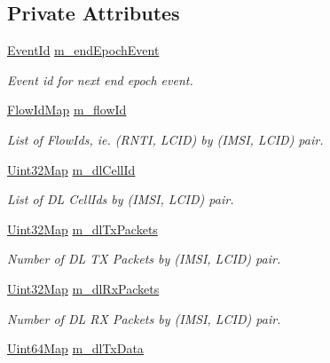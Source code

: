 \subsection*{Private Attributes}
\begin{DoxyCompactItemize}
\item 
\hyperlink{classns3_1_1EventId}{Event\+Id} \hyperlink{classns3_1_1RadioBearerStatsCalculator_a5e84f4991b455536d143b8c83a820689}{m\+\_\+end\+Epoch\+Event}
\begin{DoxyCompactList}\small\item\em Event id for next end epoch event. \end{DoxyCompactList}\item 
\hyperlink{namespacens3_aab54007b3e014c13ffebdb845302cd83}{Flow\+Id\+Map} \hyperlink{classns3_1_1RadioBearerStatsCalculator_aab26a340278a0dcfb541f2d98917c9a0}{m\+\_\+flow\+Id}
\begin{DoxyCompactList}\small\item\em List of Flow\+Ids, ie. (R\+N\+TI, L\+C\+ID) by (I\+M\+SI, L\+C\+ID) pair. \end{DoxyCompactList}\item 
\hyperlink{namespacens3_abfd8d9eba8902c110c885a991a0529cd}{Uint32\+Map} \hyperlink{classns3_1_1RadioBearerStatsCalculator_adf1e6e6d99c7fce763acea10d9fcbe7f}{m\+\_\+dl\+Cell\+Id}
\begin{DoxyCompactList}\small\item\em List of DL Cell\+Ids by (I\+M\+SI, L\+C\+ID) pair. \end{DoxyCompactList}\item 
\hyperlink{namespacens3_abfd8d9eba8902c110c885a991a0529cd}{Uint32\+Map} \hyperlink{classns3_1_1RadioBearerStatsCalculator_aea685741eb32f0f501496176deb32ccb}{m\+\_\+dl\+Tx\+Packets}
\begin{DoxyCompactList}\small\item\em Number of DL TX Packets by (I\+M\+SI, L\+C\+ID) pair. \end{DoxyCompactList}\item 
\hyperlink{namespacens3_abfd8d9eba8902c110c885a991a0529cd}{Uint32\+Map} \hyperlink{classns3_1_1RadioBearerStatsCalculator_a860af56e1228ba010a126eea7d5d0da1}{m\+\_\+dl\+Rx\+Packets}
\begin{DoxyCompactList}\small\item\em Number of DL RX Packets by (I\+M\+SI, L\+C\+ID) pair. \end{DoxyCompactList}\item 
\hyperlink{namespacens3_a02246d7bb546e26a989e837a36d17797}{Uint64\+Map} \hyperlink{classns3_1_1RadioBearerStatsCalculator_af63ed78fb87275f941f761a5362a0412}{m\+\_\+dl\+Tx\+Data}

\end{DoxyCompactItemize}
